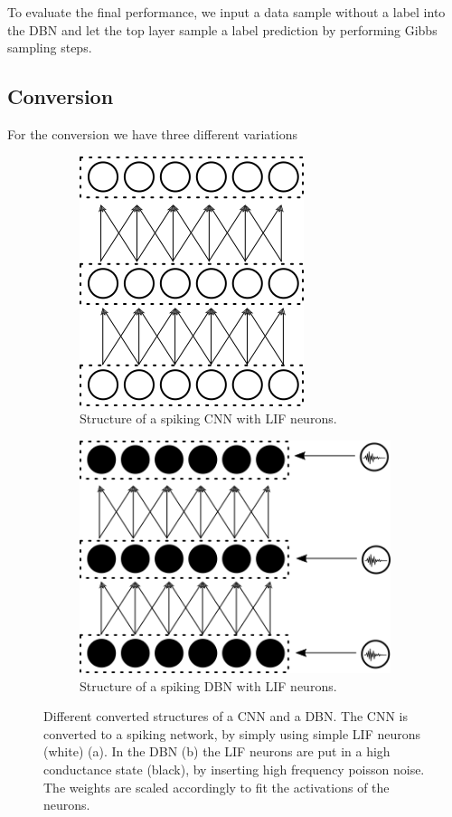 To evaluate the final performance, we input a data sample without a label into the DBN and let the top layer sample a label prediction by performing Gibbs sampling steps.


\subsection{Conversion}

For the conversion we have three different variations

\begin{figure}
	\centering
	\begin{subfigure}[t]{.5\textwidth}
  		\centering
  		\includegraphics[width=.6\linewidth]{imgs/convert_cnn.png}
  		\caption{Structure of a spiking CNN with LIF neurons.}
  		\label{fig:sub1}
	\end{subfigure}%
	\begin{subfigure}[t]{.5\textwidth}
  		\centering
  		\includegraphics[width=.8\linewidth]{imgs/convert_dbn.png}
  		\caption{Structure of a spiking DBN with LIF neurons.}
  		\label{fig:sub2}
  	\end{subfigure}
	\caption{Different converted structures of a CNN and a DBN. The CNN is converted to a spiking network, by simply using simple LIF neurons (white) (a). In the DBN (b) the LIF neurons are put in a high conductance state (black), by inserting high frequency poisson noise. The weights are scaled accordingly to fit the activations of the neurons.}
	\label{fig:converted}
\end{figure}


